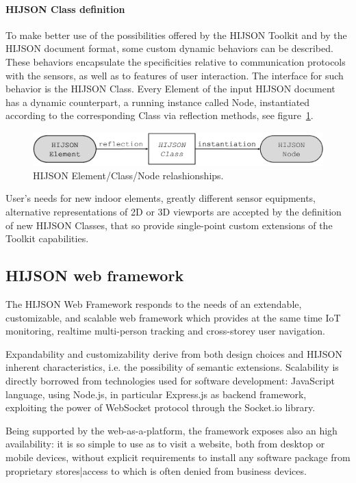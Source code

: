 \documentclass{sig-alternate}
\begin{document}
\paragraph{HIJSON Class definition}

To make better use of the possibilities offered by the HIJSON Toolkit and by
the HIJSON document format, some custom dynamic behaviors can be described.
These behaviors encapsulate the specificities relative to communication
protocols with the sensors, as well as to features of user interaction. The
interface for such behavior is the HIJSON Class. Every Element of the input
HIJSON document has a dynamic counterpart, a running instance called  Node,
instantiated according to the corresponding Class via reflection methods, see figure~\ref{fig:el-class-node}.

\begin{figure}[h]
 \centering
 \includegraphics[width=0.6\linewidth]{images/element-class-node}
 \caption{HIJSON Element/Class/Node relashionships.}
 \label{fig:el-class-node}
\end{figure}

User's needs for new indoor elements, greatly different sensor equipments,
alternative representations of 2D or 3D viewports are accepted by the
definition of new HIJSON Classes, that so provide single-point custom
extensions of the Toolkit capabilities.

\subsection{HIJSON web framework}

The HIJSON Web Framework responds to the needs of an extendable, customizable,
and scalable web framework which provides at the same time IoT monitoring,
realtime multi-person tracking and cross-storey user navigation.

Expandability and customizability derive from both design choices and HIJSON
inherent characteristics, i.e. the possibility of semantic extensions.
Scalability is directly borrowed from technologies used for software
development: JavaScript language, using Node.js, in particular Express.js as
backend framework, exploiting the power of WebSocket protocol through the
Socket.io library.

Being supported by the web-as-a-platform, the framework exposes also an high
availability: it is so simple to use as to visit a website, both from desktop
or mobile devices, without explicit requirements to install any software
package from proprietary stores|access to which is often denied from business
devices.
\end{document}
